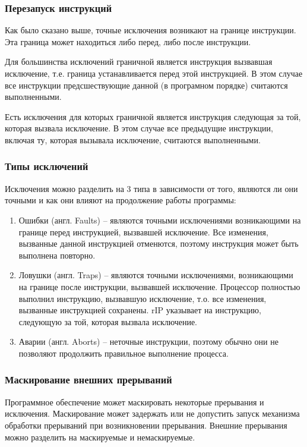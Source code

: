 \subsubsection*{Перезапуск инструкций}
Как было сказано выше, точные исключения возникают на границе инструкции. Эта
граница может находиться либо перед, либо после инструкции.

Для большинства исключений граничной является инструкция вызвавшая исключение,
т.е. граница устанавливается перед этой инструкцией. В этом случае все
инструкции предсшествующие данной (в програмном порядке) считаются
выполненными.

Есть исключения для которых граничной является инструкция следующая за той,
которая вызвала исключение. В этом случае все предыдущие инструкции, включая
ту, которая вызывала исключение, считаются выполненными.

\subsubsection*{Типы исключений}
Исключения можно разделить на 3 типа в зависимости от того, являются ли они
точными и как они влияют на продолжение работы программы:
\begin{enumerate}[1.]
\item Ошибки (англ. Faults) -- являются точными исключениями возникающими на границе перед
инструкцией, вызвавшей исключение. Все изменения, вызванные данной инструкцией
отменются, поэтому инструкция может быть выполнена повторно.
\item Ловушки (англ. Traps) -- являются точными исключениями, возникающими на границе после
инструкции, вызвавшей исключение. Процессор полностью выполнил инструкцию,
вызвавшую исключение, т.о. все изменения, вызванные инструкцией сохранены.
rIP указывает на инструкцию, следующую за той, которая вызвала исключение.
\item Аварии (англ. Aborts) -- неточные инструкции, поэтому обычно они не позволяют
продолжить правильное выполнение процесса.
\end{enumerate}

\subsubsection*{Маскирование внешних прерываний}
Программное обеспечение может маскировать некоторые прерывания и исключения.
Маскирование может задержать или не допустить запуск механизма обработки
прерываний при возникновении прерывания. Внешние прерывания можно разделить на
маскируемые и немаскируемые.

